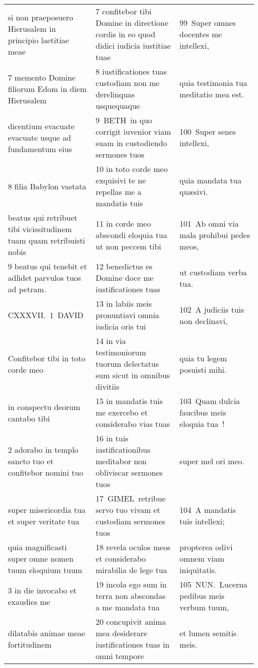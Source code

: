 \documentclass{article}
\begin{document}
\begin{longtable}{@{}p{}p{}p{}@{}}
si non praeposuero Hierusalem in principio laetitiae meae	&	7 confitebor tibi Domine in directione cordis in eo quod didici iudicia iustitiae tuae	&	99 Super omnes docentes me intellexi,	\\
7 memento Domine filiorum Edom in diem Hierusalem	&	8 iustificationes tuas custodiam non me derelinquas usquequaque	&	quia testimonia tua meditatio mea est.	\\
dicentium evacuate evacuate usque ad fundamentum eius	&	9 BETH in quo corrigit iuvenior viam suam in custodiendo sermones tuos	&	100 Super senes intellexi,	\\
8 filia Babylon vastata	&	10 in toto corde meo exquisivi te ne repellas me a mandatis tuis	&	quia mandata tua quæsivi.	\\
beatus qui retribuet tibi vicissitudinem tuam quam retribuisti nobis	&	11 in corde meo abscondi eloquia tua ut non peccem tibi	&	101 Ab omni via mala prohibui pedes meos,	\\
9 beatus qui tenebit et adlidet parvulos tuos ad petram.	&	12 benedictus es Domine doce me iustificationes tuas	&	ut custodiam verba tua.	\\
CXXXVII. 1 DAVID	&	13 in labiis meis pronuntiavi omnia iudicia oris tui	&	102 A judiciis tuis non declinavi,	\\
Confitebor tibi in toto corde meo	&	14 in via testimoniorum tuorum delectatus sum sicut in omnibus divitiis	&	quia tu legem posuisti mihi.	\\
in conspectu deorum cantabo tibi	&	15 in mandatis tuis me exercebo et considerabo vias tuas	&	103 Quam dulcia faucibus meis eloquia tua !	\\
2 adorabo in templo sancto tuo et confitebor nomini tuo	&	16 in tuis iustificationibus meditabor non obliviscar sermones tuos	&	super mel ori meo.	\\
super misericordia tua et super veritate tua	&	17 GIMEL retribue servo tuo vivam et custodiam sermones tuos	&	104 A mandatis tuis intellexi;	\\
quia magnificasti super omne nomen tuum eloquium tuum	&	18 revela oculos meos et considerabo mirabilia de lege tua	&	propterea odivi omnem viam iniquitatis.	\\
3 in die invocabo et exaudies me	&	19 incola ego sum in terra non abscondas a me mandata tua	&	105 NUN. Lucerna pedibus meis verbum tuum,	\\
dilatabis animae meae fortitudinem	&	20 concupivit anima mea desiderare iustificationes tuas in omni tempore	&	et lumen semitis meis.	\\

\end{longtable}
\end{document}
